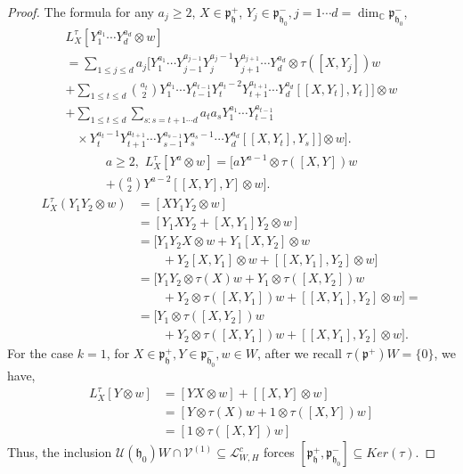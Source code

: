 \documentclass[12pt]{amsart}
\theoremstyle{definition}
\theoremstyle{remark}
\newcommand{\h}{\mathfrak{h}}
\newcommand{\p}{\mathfrak p}
\newcommand{\C}{{\mathbb C}}
\numberwithin{equation}{section}
\begin{document}
\begin{proof}
The formula for any $a_j \geq 2  $, $X \in \p_\h^+$, $ Y_j \in \p_{\h_0}^- , j=1\cdots d=\dim_\C \p_{\h_0}^-   $,
 \begin{multline} \label{eq:formulapiX}
 L_X^\tau[Y_1^{a_1}\cdots Y_d^{a_d}\otimes w] \\
                    =\sum_{1\leq j \leq d} a_j [   Y_1^{a_1} \cdots Y_{j-1}^{a_{j-1}}Y_j^{a_j -1} Y_{j +1}^{a_{j+1}}\cdots Y_d^{a_d} \otimes \tau([X,Y_j])w \\
+\sum_{1\leq t \leq d} \binom{a_t}{2}  Y_1^{a_1} \cdots Y_{t-1}^{a_{t-1}}Y_t^{a_t -2} Y_{t+1}^{a_{t+1}}\cdots Y_d^{a_d}[[X,Y_t],Y_t]]  \otimes w \\
+\sum_{1\leq t \leq d} \sum_{s:s=t+1\cdots d} a_t a_{s}
 Y_1^{a_1} \cdots Y_{t-1}^{a_{t-1}} \\  \,\,\,\,\, \times
Y_t^{a_t -1}  Y_{t+1}^{a_{t +1}}\cdots Y_{s-1}^{a_{s-1}}  Y_{s}^{a_s -1}\cdots Y_d^{a_d} [[X,Y_{t}],Y_s]]   \otimes  w  ].
\end{multline}
\begin{multline} \label{eq:formulapiX2} a\geq 2, \,\,
 L_X^\tau[Y^{a} \otimes w]
                    =   [  a  Y^{a-1}  \otimes \tau([X,Y])w \\
+\binom{a}{2}  Y^{a -2} [[X,Y],Y]  \otimes w].
\end{multline}
\begin{equation*} \begin{split} L_X^\tau(Y_1Y_2\otimes w)& =[XY_1Y_2 \otimes w] \\ & = [Y_1XY_2 + [X,Y_1]Y_2 \otimes w ]
\\ & = [ Y_1Y_2X\otimes w + Y_1[X,Y_2]\otimes w \\ & \quad \quad +Y_2[X,Y_1]\otimes w
+[[X,Y_1],Y_2] \otimes w ]
\\ & = [Y_1Y_2\otimes \tau(X)w + Y_1 \otimes \tau([X,Y_2])w \\ & \quad \quad + Y_2\otimes  \tau([X,Y_1])w +
[[X,Y_1],Y_2] \otimes w]=\\ & = [ Y_1 \otimes \tau([X,Y_2])w \\ & \quad \quad + Y_2\otimes  \tau([X,Y_1])w +
[[X,Y_1],Y_2] \otimes w]. \end{split}
\end{equation*}
For the case $k=1$, for $X\in \p_\h^+, Y \in \p_{\h_0}^-, w \in W$,   after we recall $\tau(\p^+)W=\{0\}$, we have,
\begin{equation*} \begin{split} L_X^\tau[Y\otimes w]& = [ YX \otimes w]+[[X,Y] \otimes w]
 \\ &   = [ Y \otimes \tau(X)w  + 1    \otimes \tau([X,Y]) w  ]
 \\ &   = [   1    \otimes \tau([X,Y]) w  ]
 \end{split}
\end{equation*}
Thus, the inclusion    $\mathcal U(\h_0)W \cap \mathcal V^{(1)}
   \subseteq  \mathcal L_{W,H}^c$ forces   $[\p_\h^+, \p_{\h_0}^-] \subseteq Ker(\tau)$.
\end{proof}
\end{document}

